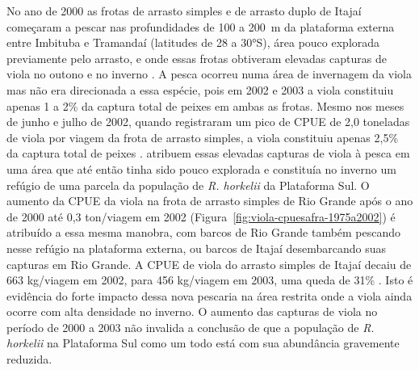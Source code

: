 \documentclass[a4paper,11pt,twoside,showtrims,onecolumn,openright,final]{memoir}
\begin{document}
No ano de 2000 as frotas de arrasto simples e de arrasto duplo de Itajaí começaram 
a pescar nas profundidades de 100 a 200~m da plataforma externa entre Imbituba 
e Tramandaí (latitudes de 28 a 30°S), área pouco explorada previamente pelo arrasto, 
e onde essas frotas obtiveram elevadas capturas de viola no outono e no inverno \citep{martins2003}. %
A pesca ocorreu numa área de invernagem da viola mas não era direcionada a essa espécie, 
pois em 2002 e 2003 a viola constituiu apenas 1 a 2\% da captura total de peixes em ambas 
as frotas. Mesmo nos meses de junho e julho de 2002, quando \citet{martins2003}
registraram um pico de CPUE de 2,0 toneladas de viola por viagem da frota de arrasto simples, 
a viola constituiu apenas 2,5\% da captura total de peixes \citep{univali2003}. %
\citet{martins2003} atribuem essas elevadas capturas de viola à pesca em uma área que 
até então tinha sido pouco explorada e constituía no inverno um refúgio de uma parcela da 
população de \emph{R. horkelii} da Plataforma Sul. O aumento da CPUE da viola na frota de arrasto 
simples de Rio Grande após o ano de 2000 até 0,3 ton/viagem em 2002 (Figura~\ref{fig:viola-cpuesafra-1975a2002}) 
é atribuído a essa mesma manobra, com barcos de Rio Grande também pescando nesse 
refúgio na plataforma externa, ou barcos de Itajaí desembarcando suas capturas em Rio Grande. 
A CPUE de viola do arrasto simples de Itajaí decaiu de 663 kg/viagem em 2002, para 456 kg/viagem 
em 2003, uma queda de 31\% \citep{univali2003,univali2004}. Isto é evidência do forte impacto dessa 
nova pescaria na área restrita onde a viola ainda ocorre com alta densidade no inverno. 
O aumento das capturas de viola no período de 2000 a 2003 não invalida a conclusão 
de que a população de \emph{R. horkelii} na Plataforma Sul como um todo está com 
sua abundância gravemente reduzida.
\end{document}
